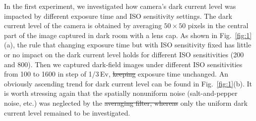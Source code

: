 \documentclass[9pt,twocolumn,twoside]{osajnl}
\providecommand{\DIFadd}[1]{{\protect\color{blue}\uwave{#1}}} %
\providecommand{\DIFdel}[1]{{\protect\color{red}\sout{#1}}}                      %
\providecommand{\DIFaddbegin}{} %
\providecommand{\DIFaddend}{} %
\providecommand{\DIFdelbegin}{} %
\providecommand{\DIFdelend}{} %
\begin{document}
	In the first experiment, we investigated how camera’s dark current level was impacted by different exposure time and ISO sensitivity settings. The dark current level of the camera is obtained by averaging $50\times50$ pixels in the central part of the image captured in dark room with a lens cap. As shown in Fig.~\ref{fig:1}(a), the rule that changing exposure time but with ISO sensitivity fixed has little or no impact on the dark current level holds for different ISO sensitivities (200 and 800). Then we captured dark-field images under different ISO sensitivities from 100 to 1600 in step of 1/3\,Ev, \DIFdelbegin \DIFdel{keeping }\DIFdelend \DIFaddbegin \DIFadd{with }\DIFaddend exposure time unchanged. An obviously ascending trend for dark current level can be found in Fig.~\ref{fig:1}(b). It is worth stressing again that the spatially nonuniform noise (salt-and-pepper noise, etc.) was neglected by the \DIFdelbegin \DIFdel{averaging filter, whereas }\DIFdelend \DIFaddbegin \DIFadd{average filter, }\DIFaddend only the uniform dark current level remained to be investigated.
\end{document}

